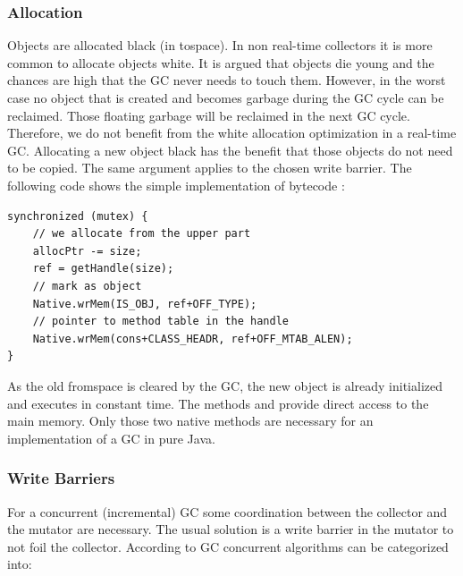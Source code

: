 \subsubsection{Allocation}

Objects are allocated black (in tospace). In non real-time collectors
it is more common to allocate objects white. It is argued
\cite{gc:dijkstra78} that objects die young and the chances are high
that the GC never needs to touch them. However, in the worst case no
object that is created and becomes garbage during the GC cycle can be
reclaimed. Those floating garbage will be reclaimed in the next GC
cycle. Therefore, we do not benefit from the white allocation
optimization in a real-time GC. Allocating a new object black has the
benefit that those objects do not need to be copied. The same
argument applies to the chosen write barrier. The following code
shows the simple implementation of bytecode :

\begin{samepage}
\begin{lstlisting}
synchronized (mutex) {
    // we allocate from the upper part
    allocPtr -= size;
    ref = getHandle(size);
    // mark as object
    Native.wrMem(IS_OBJ, ref+OFF_TYPE);
    // pointer to method table in the handle
    Native.wrMem(cons+CLASS_HEADR, ref+OFF_MTAB_ALEN);
}
\end{lstlisting}
\end{samepage}

As the old fromspace is cleared by the GC, the new object is already
initialized and  executes in constant time. The methods
 and  provide direct access
to the main memory. Only those two native methods are necessary for
an implementation of a GC in pure Java.

\subsubsection{Write Barriers}

For a concurrent (incremental) GC some coordination between the
collector and the mutator are necessary. The usual solution is a
write barrier in the mutator to not foil the collector. According to
\cite{gc:wils94} GC concurrent algorithms can be categorized into:

